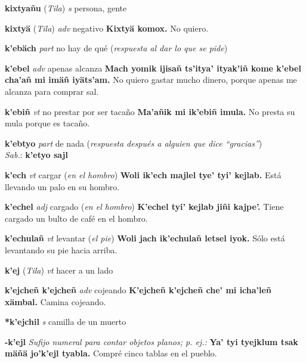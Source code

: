 \documentclass[10pt]{scrbook}
\newcommand{\entry}[1]{\textbf{#1}}
\newcommand{\alphaletter}[1]{\end{multicols}\addsec{#1}\begin{multicols}{2}}
\newcommand{\nontranslationdef}[1]{\textit{#1}}
\newcommand{\partofspeech}[1]{\textit{#1}}
\newcommand{\spanishtranslation}[1]{#1}
\newcommand{\clarification}[1]{(\textit{#1})}
\newcommand{\cholexample}[1]{\textbf{#1}}
\newcommand{\exampletranslation}[1]{#1}
\newcommand{\dialectvariant}[1]{\\\textit{#1}:}
\newcommand{\dialectword}[1]{\textbf{#1}}
\newcommand{\relevantdialect}[1]{(\textit{#1})}
\begin{document}
\begin{multicols}{2}
\entry{kixtyañu}
\relevantdialect{Tila}
\partofspeech{s}
\spanishtranslation{persona, gente}

\entry{kixtyä}
\relevantdialect{Tila}
\partofspeech{adv}
\spanishtranslation{negativo}
\cholexample{Kixtyä komox.}
\exampletranslation{No quiero.}

\alphaletter{Q'}

\entry{k'ebäch}
\partofspeech{part}
\spanishtranslation{no hay de qué}
\clarification{respuesta al dar lo que se pide}

\entry{k'ebel}
\partofspeech{adv}
\spanishtranslation{apenas alcanza}
\cholexample{Mach yomik ijisañ ts'itya' ityak'iñ kome k'ebel cha'añ mi imäñ iyäts'am.}
\exampletranslation{No quiero gastar mucho dinero, porque apenas me alcanza para comprar sal.}

\entry{k'ebiñ}
\partofspeech{vt}
\spanishtranslation{no prestar por ser tacaño}
\cholexample{Ma'añik mi ik'ebiñ imula.}
\exampletranslation{No presta su mula porque es tacaño.}

\entry{k'ebtyo}
\partofspeech{part}
\spanishtranslation{de nada}
\clarification{respuesta después a alguien que dice “gracias”}
\dialectvariant{Sab.}
\dialectword{k'etyo sajl}

\entry{k'ech}
\partofspeech{vt}
\spanishtranslation{cargar}
\clarification{en el hombro}
\cholexample{Woli ik'ech majlel tye' tyi' kejlab.}
\exampletranslation{Está llevando un palo en su hombro.}

\entry{k'echel}
\partofspeech{adj}
\spanishtranslation{cargado}
\clarification{en el hombro}
\cholexample{K'echel tyi' kejlab jiñi kajpe'.}
\exampletranslation{Tiene cargado un bulto de café en el hombro.}

\entry{k'echulañ}
\partofspeech{vt}
\spanishtranslation{levantar}
\clarification{el pie}
\cholexample{Woli jach ik'echulañ letsel iyok.}
\exampletranslation{Sólo está levantando su pie hacia arriba.}

\entry{k'ej}
\relevantdialect{Tila}
\partofspeech{vt}
\spanishtranslation{hacer a un lado}

\entry{k'ejcheñ k'ejcheñ}
\partofspeech{adv}
\spanishtranslation{cojeando}
\cholexample{K'ejcheñ k'ejcheñ che' mi icha'leñ xämbal.}
\exampletranslation{Camina cojeando.}

\entry{*k'ejchil}
\partofspeech{s}
\spanishtranslation{camilla de un muerto}

\entry{-k'ejl}
\nontranslationdef{Sufijo numeral para contar objetos planos; p. ej.:}
\cholexample{Ya' tyi tyejklum tsak mäñä jo'k'ejl tyabla.}
\exampletranslation{Compré cinco tablas en el pueblo.}


\end{multicols}
\end{document}
